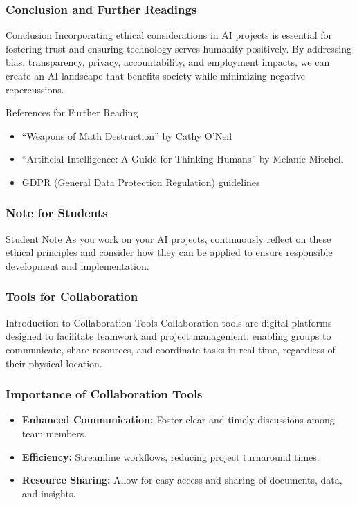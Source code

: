 \documentclass[aspectratio=169]{beamer}
\begin{document}
\begin{frame}[fragile]
    \frametitle{Conclusion and Further Readings}
    \begin{block}{Conclusion}
        Incorporating ethical considerations in AI projects is essential for fostering trust and ensuring technology serves humanity positively. By addressing bias, transparency, privacy, accountability, and employment impacts, we can create an AI landscape that benefits society while minimizing negative repercussions.
    \end{block}

    \begin{block}{References for Further Reading}
        \begin{itemize}
            \item “Weapons of Math Destruction” by Cathy O’Neil
            \item “Artificial Intelligence: A Guide for Thinking Humans” by Melanie Mitchell
            \item GDPR (General Data Protection Regulation) guidelines
        \end{itemize}
    \end{block}
\end{frame}

\begin{frame}[fragile]
    \frametitle{Note for Students}
    \begin{block}{Student Note}
        As you work on your AI projects, continuously reflect on these ethical principles and consider how they can be applied to ensure responsible development and implementation.
    \end{block}
\end{frame}

\begin{frame}[fragile]
    \frametitle{Tools for Collaboration}
    \begin{block}{Introduction to Collaboration Tools}
        Collaboration tools are digital platforms designed to facilitate teamwork and project management, enabling groups to communicate, share resources, and coordinate tasks in real time, regardless of their physical location.
    \end{block}
\end{frame}

\begin{frame}[fragile]
    \frametitle{Importance of Collaboration Tools}
    \begin{itemize}
        \item \textbf{Enhanced Communication:} Foster clear and timely discussions among team members.
        \item \textbf{Efficiency:} Streamline workflows, reducing project turnaround times.
        \item \textbf{Resource Sharing:} Allow for easy access and sharing of documents, data, and insights.
    \end{itemize}
\end{frame}
\end{document}
